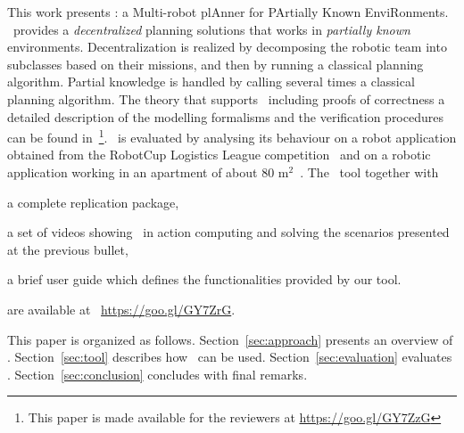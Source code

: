 This work presents  \toolName: a Multi-robot plAnner for PArtially Known EnviRonments.
 \toolName\ provides a  \emph{decentralized} planning solutions that works in \emph{partially known} environments.
 Decentralization is realized by decomposing the robotic team into subclasses based on their missions, and then by running a classical planning algorithm.
Partial knowledge is handled by calling several times  a classical planning algorithm.
The theory that supports \toolName\ including proofs of correctness a detailed description of the modelling formalisms and the verification procedures can be found in~\cite{mapmaker17}\footnote{This paper is made available for the reviewers   at  \url{https://goo.gl/GY7ZzG}}.
\toolName\ is evaluated by analysing its behaviour on a robot application obtained from the RobotCup Logistics League competition~\cite{karrasrobocup} and on a robotic application working in an apartment of about 80 m$^2$~\cite{map}.
The \toolName\ tool together with 
\begin{enumerate*}
\item a complete replication package,
\item a set of videos showing \toolName\ in action computing and solving the scenarios presented at the previous bullet,
\item a brief user guide which defines the functionalities provided by our tool.
\end{enumerate*}
 are available at ~\url{https://goo.gl/GY7ZrG}. 

This paper is organized as follows. 
Section~\ref{sec:approach} presents an overview of \toolName.
Section~\ref{sec:tool} describes how  \toolName\ can be used.
Section~\ref{sec:evaluation} evaluates  \toolName.
Section~\ref{sec:conclusion} concludes with final remarks.

